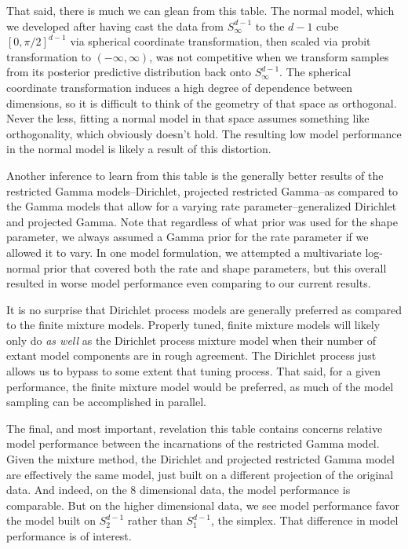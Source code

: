 That said, there is much we can glean from this table.  The normal model, which we developed after
  having cast the data from $S_{\infty}^{d-1}$ to the $d-1$ cube $[0,\pi/2]^{d-1}$ via spherical
  coordinate transformation, then scaled via probit transformation to $(-\infty,\infty)$, was not
  competitive when we transform samples from its posterior predictive distribution back onto
  $S_{\infty}^{d-1}$. The spherical coordinate transformation induces a high degree of dependence
  between dimensions, so it is difficult to think of the geometry of that space as orthogonal.
  Never the less, fitting a normal model in that space assumes something like orthogonality, which
  obviously doesn't hold.  The resulting low model performance in the normal model is likely a
  result of this distortion.

Another inference to learn from this table is the generally better results of the restricted Gamma
  models--Dirichlet, projected restricted Gamma--as compared to the Gamma models that allow for a
  varying rate parameter--generalized Dirichlet and projected Gamma.  Note that regardless of what
  prior was used for the shape parameter, we always assumed a Gamma prior for the rate parameter if
  we allowed it to vary.  In one model formulation, we attempted a multivariate log-normal prior that
  covered both the rate and shape parameters, but this overall resulted in worse model performance
  even comparing to our current results.

It is no surprise that Dirichlet process models are generally preferred as compared to the finite
  mixture models.  Properly tuned, finite mixture models will likely only do \emph{as well} as the
  Dirichlet process mixture model when their number of extant model components are in rough
  agreement.  The Dirichlet process just allows us to bypass to some extent that tuning process.
  That said, for a given performance, the finite mixture model would be preferred, as much of the
  model sampling can be accomplished in parallel.

The final, and most important, revelation this table contains concerns relative model performance
  between the incarnations of the restricted Gamma model.  Given the mixture method, the Dirichlet
  and projected restricted Gamma model are effectively the same model, just built on a different
  projection of the original data.  And indeed, on the 8 dimensional data, the model performance is
  comparable.  But on the higher dimensional data, we see model performance favor the model built on
  $S_{2}^{d-1}$ rather than $S_1^{d-1}$, the simplex.  That difference in model performance is of
  interest.


